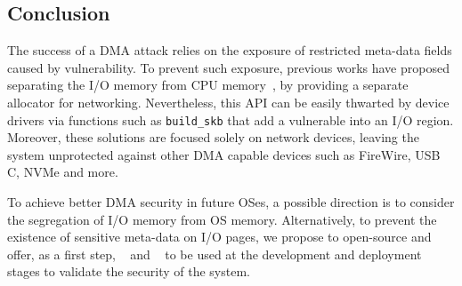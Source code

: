 \subsection{Conclusion}\label{sec:Conclusion}




The success of a DMA attack relies on the exposure of restricted meta-data fields caused by \subpage{} vulnerability. 
To prevent such exposure, previous works have proposed separating the I/O memory from CPU memory~\cite{MSMT18}, by providing a separate allocator for networking. 
Nevertheless, this API can be easily thwarted by device drivers via functions such as \texttt{build\_skb} that add a vulnerable \shinfo into an I/O region. 
Moreover, these solutions are focused solely on network devices, leaving the system unprotected against other DMA capable devices such as FireWire, USB C, NVMe and more.


To achieve better DMA security in future OSes, a possible direction is to consider the segregation of I/O memory from OS memory. 
Alternatively, to prevent the existence of sensitive meta-data on I/O pages, we propose to open-source and offer, as a first step, \tool{}~\cite{SPADE} and \dkasan{}~\cite{DKASAN} to be used at the development and deployment stages to validate the security of the system. 



 




